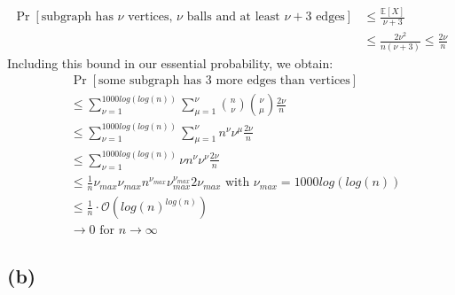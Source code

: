 \documentclass[a4paper,german]{article}
\newcommand{\E}{\mathbb{E}}
\begin{document}
	 \begin{align*}
	 	\Pr[\text{subgraph has }  \nu \text{ vertices, } \nu \text{ balls  and at least } \nu + 3 \text{ edges}] &\leq \frac{\E[X]}{\nu +3} \\
	 	&\leq \frac{2 \nu ^2}{n (\nu +3)} \leq \frac{2\nu}{n}
	\end{align*}
	Including this bound in our essential probability, we obtain:
	\begin{align*}
		& \Pr[\text{some subgraph has 3 more edges than vertices}] \\
		&\leq \sum_{\nu = 1}^{1000 log(log(n))} \sum_{\mu = 1}^{\nu} {n \choose \nu} {\nu \choose \mu} \frac{2\nu}{n} \\
		&\leq \sum_{\nu = 1}^{1000 log(log(n))} \sum_{\mu = 1}^{\nu} n^\nu \nu^\mu \frac{2\nu}{n} \\
		&\leq \sum_{\nu = 1}^{1000 log(log(n))} \nu n^\nu \nu^\nu \frac{2\nu}{n} \\
		&\leq \frac{1}{n} \nu_{max} \nu_{max}  n^{\nu_{max}}  \nu_{max} ^{\nu_{max}}  2 \nu_{max} \text{ with } \nu_{max} = 1000 log(log(n)) \\
		&\leq \frac{1}{n} \cdot \mathcal{O} (log(n)^{log(n)}) \\
		& \to 0 \text{ for } n \to \infty
	\end{align*}
\subsection*{(b)}
\end{document}
